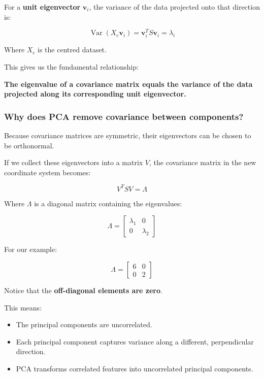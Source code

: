 \documentclass[11pt]{article}
\providecommand{\tightlist}{%
      \setlength{\itemsep}{0pt}\setlength{\parskip}{0pt}}
\begin{document}
For a \textbf{unit eigenvector} \(\mathbf{v}_i\), the variance of the
data projected onto that direction is:

\[
\boxed{
\operatorname{Var}(X_c\mathbf{v}_i)
=
\mathbf{v}_i^T S\mathbf{v}_i
=
\lambda_i
}
\]

Where \(X_c\) is the centred dataset.

This gives us the fundamental relationship:

\textbf{The eigenvalue of a covariance matrix equals the variance of the
data projected along its corresponding unit eigenvector.}

\subsubsection{Why does PCA remove covariance between
components?}\label{why-does-pca-remove-covariance-between-components}

Because covariance matrices are symmetric, their eigenvectors can be
chosen to be orthonormal.

If we collect these eigenvectors into a matrix \(V\), the covariance
matrix in the new coordinate system becomes:

\[
\boxed{
V^T S V = \Lambda
}
\]

Where \(\Lambda\) is a diagonal matrix containing the eigenvalues:

\[
\Lambda =
\begin{bmatrix}
\lambda_1 & 0 \\
0 & \lambda_2
\end{bmatrix}
\]

For our example:

\[
\Lambda =
\begin{bmatrix}
6 & 0 \\
0 & 2
\end{bmatrix}
\]

Notice that the \textbf{off-diagonal elements are zero}.

This means:

\begin{itemize}
\tightlist
\item
  The principal components are uncorrelated.
\item
  Each principal component captures variance along a different,
  perpendicular direction.
\item
  PCA transforms correlated features into uncorrelated principal
  components.
\end{itemize}
\end{document}
